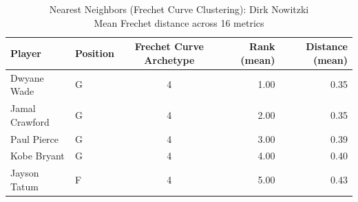 \begin{table}[t]
\caption*{
{\fontsize{20}{25} Nearest Neighbors (Frechet Curve Clustering): Dirk Nowitzki\fontsize{12}{15}\selectfont } \\ 
{\fontsize{14}{17}\selectfont  Mean Frechet distance across 16 metrics\fontsize{12}{15}\selectfont }
} 
\fontsize{12.0pt}{14.0pt}\selectfont
\begin{tabular*}{\linewidth}{@{\extracolsep{\fill}}llcrr}
\toprule
Player & Position & Frechet Curve Archetype & Rank (mean) & Distance (mean) \\ 
\midrule\addlinespace[2.5pt]
Dwyane Wade & G & 4 & 1.00 & 0.35 \\ 
Jamal Crawford & G & 4 & 2.00 & 0.35 \\ 
Paul Pierce & G & 4 & 3.00 & 0.39 \\ 
Kobe Bryant & G & 4 & 4.00 & 0.40 \\ 
Jayson Tatum & F & 4 & 5.00 & 0.43 \\ 
\bottomrule
\end{tabular*}
\end{table}

